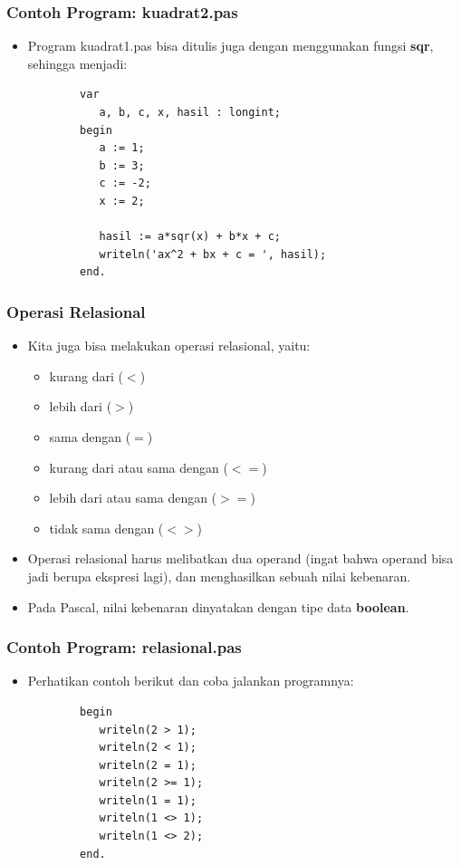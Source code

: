 \documentclass{beamer}
\begin{document}
\begin{frame}[fragile]
\frametitle{Contoh Program: kuadrat2.pas}
\begin{itemize}
    \item Program kuadrat1.pas bisa ditulis juga dengan menggunakan fungsi \textbf{sqr}, sehingga menjadi:
    \begin{lstlisting}
        var
           a, b, c, x, hasil : longint;
        begin
           a := 1;
           b := 3;
           c := -2;
           x := 2;

           hasil := a*sqr(x) + b*x + c;
           writeln('ax^2 + bx + c = ', hasil);
        end.
    \end{lstlisting}
\end{itemize}
\end{frame}

\begin{frame}
\frametitle{Operasi Relasional}
\begin{itemize}
    \item Kita juga bisa melakukan operasi relasional, yaitu:
    \begin{itemize}
        \item kurang dari ($<$)
        \item lebih dari ($>$)
        \item sama dengan ($=$)
        \item kurang dari atau sama dengan ($<=$)
        \item lebih dari atau sama dengan ($>=$)
        \item tidak sama dengan ($<>$)
    \end{itemize}
    \item Operasi relasional harus melibatkan dua operand (ingat bahwa operand bisa jadi berupa ekspresi lagi), dan menghasilkan sebuah nilai kebenaran.
    \item Pada Pascal, nilai kebenaran dinyatakan dengan tipe data \alert{\textbf{boolean}}.
\end{itemize}
\end{frame}

\begin{frame}[fragile]
\frametitle{Contoh Program: relasional.pas}
\begin{itemize}
    \item Perhatikan contoh berikut dan coba jalankan programnya:
    \begin{lstlisting}
        begin
           writeln(2 > 1);
           writeln(2 < 1);
           writeln(2 = 1);
           writeln(2 >= 1);
           writeln(1 = 1);
           writeln(1 <> 1);
           writeln(1 <> 2);
        end.
    \end{lstlisting}
\end{itemize}
\end{frame}
\end{document}
